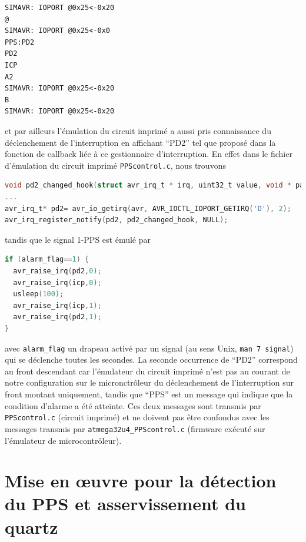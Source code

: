 \documentclass[a4paper]{article}
\begin{document}
{\footnotesize
\begin{verbatim}
SIMAVR: IOPORT @0x25<-0x20
@
SIMAVR: IOPORT @0x25<-0x0
PPS:PD2
PD2
ICP
A2
SIMAVR: IOPORT @0x25<-0x20
B
SIMAVR: IOPORT @0x25<-0x20
\end{verbatim}
}
\noindent et par ailleurs l'\'emulation du circuit imprim\'e a aussi pris 
connaissance du d\'eclenchement de l'interruption en affichant ``PD2'' tel 
que propos\'e dans la fonction de callback li\'ee \`a ce gestionnaire 
d'interruption. En effet dans le fichier d'\'emulation du circuit imprim\'e 
{\tt PPScontrol.c}, nous trouvons
\begin{lstlisting}[language=C]
void pd2_changed_hook(struct avr_irq_t * irq, uint32_t value, void * param) {printf("PD2\n");}
...
avr_irq_t* pd2= avr_io_getirq(avr, AVR_IOCTL_IOPORT_GETIRQ('D'), 2);
avr_irq_register_notify(pd2, pd2_changed_hook, NULL);
\end{lstlisting}
\noindent tandis que le signal 1-PPS est \'emul\'e par
\begin{lstlisting}[language=C]
if (alarm_flag==1) {
  avr_raise_irq(pd2,0);
  avr_raise_irq(icp,0);
  usleep(100);
  avr_raise_irq(icp,1);
  avr_raise_irq(pd2,1);
}
\end{lstlisting}
\noindent avec {\tt alarm\_flag} un drapeau activ\'e par un signal (au sens 
Unix, {\tt man 7 signal}) qui se d\'eclenche toutes les secondes. La seconde 
occurrence de ``PD2'' correspond au front descendant car l'\'emulateur du 
circuit imprim\'e n'est pas au courant de notre configuration sur le 
micronctr\^oleur du d\'eclenchement de l'interruption sur front montant 
uniquement, tandis que ``PPS'' est un message qui indique que la condition 
d'alarme a \'et\'e atteinte. Ces deux messages sont transmis par {\tt 
PPScontrol.c} (circuit imprim\'e) et ne doivent pas \^etre confondus avec les 
messages transmis par {\tt atmega32u4\_PPScontrol.c} (firmware ex\'ecut\'e sur 
l'\'emulateur de microcontr\^oleur).

\section{Mise en \oe uvre pour la d\'etection du PPS et asservissement du quartz}
\end{document}
